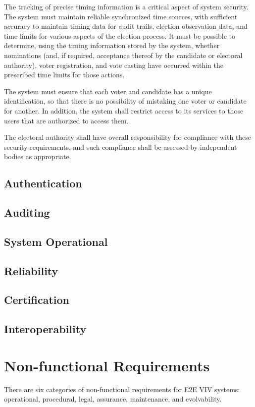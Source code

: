The tracking of precise timing information is a critical aspect of
system security. The system must maintain reliable synchronized time
sources, with sufficient accuracy to maintain timing data for audit
trails, election observation data, and time limits for various aspects
of the election process. It must be possible to determine, using the
timing information stored by the system, whether nominations (and, if
required, acceptance thereof by the candidate or electoral authority),
voter registration, and vote casting have occurred within the
prescribed time limits for those actions.

The system must ensure that each voter and candidate has a unique
identification, so that there is no possibility of mistaking one voter
or candidate for another. In addition, the system shall restrict
access to its services to those users that are authorized to access them.

The electoral authority shall have overall responsibility for
compliance with these security requirements, and such compliance shall
be assessed by independent bodies as appropriate.

\subsection{Authentication}
\lipsum[6]
\subsection{Auditing}
\lipsum[7]
\subsection{System Operational}
\lipsum[8]
\subsection{Reliability}
\lipsum[9]
\subsection{Certification}
\lipsum[10]
\subsection{Interoperability}
\lipsum[11]

\section{Non-functional Requirements}
There are six categories of non-functional requirements for E2E VIV
systems: operational, procedural, legal, assurance, maintenance, and
evolvability.

